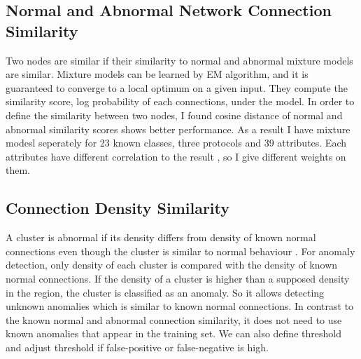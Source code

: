 \subsection{Normal and Abnormal Network Connection Similarity}
\label{subsec:normalabnormalsimilarity}
Two nodes are similar if their similarity to normal and abnormal mixture models are similar. 
Mixture models can be learned by EM algorithm, and it is guaranteed to converge to a local optimum on a given input. 
They compute the similarity score, log probability of each connections, under the model. 
In order to define the similarity between two nodes, I found cosine distance of normal and abnormal similarity scores shows better performance. 
As a result I have mixture modesl seperately for 23 known classes, three protocols and 39 attributes. 
Each attributes have different correlation to the result \cite{olusola10}\cite{kayacik05}, so I give different weights on them.
%

\subsection{Connection Density Similarity}
\label{subsec:densitysimilarity}
A cluster is abnormal if its density differs from density of known normal connections even though the cluster is similar to normal behaviour \cite{ester96}. 
For anomaly detection, only density of each cluster is compared with the density of known normal connections. 
If the density of a cluster is higher than a supposed density in the region, the cluster is classified as an anomaly. 
So it allows detecting unknown anomalies which is similar to known normal connections. 
In contrast to the known normal and abnormal connection similarity, it does not need to use known anomalies that appear in the training set. 
We can also define threshold and adjust threshold if false-positive or false-negative is high. 

